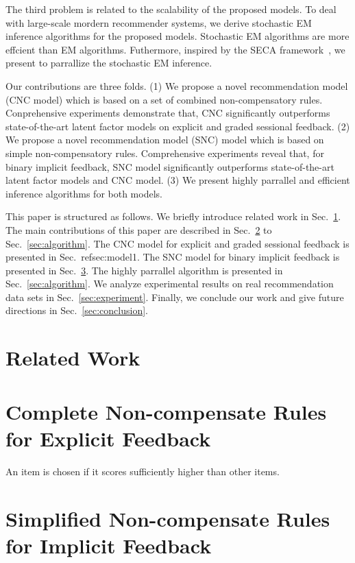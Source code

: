\documentclass[conference]{IEEEtran}
\begin{document}
The third problem is related to the scalability of the proposed models. To deal with large-scale mordern recommender systems, we derive stochastic EM inference algorithms for the proposed models. Stochastic EM algorithms are more effcient than EM algorithms. Futhermore, inspired by the SECA framework~\cite{}, we present to parrallize the stochastic EM inference.   

Our contributions are three folds. (1) We propose a novel recommendation model (CNC model) which is based on a set of combined non-compensatory rules. Conprehensive experiments demonstrate that, CNC significantly outperforms state-of-the-art latent factor models on explicit and graded sessional feedback. (2) We propose a novel recommendation model (SNC) model which is based on simple non-compensatory rules. Comprehensive experiments reveal that,  for binary implicit feedback, SNC model significantly outperforms state-of-the-art latent factor models and CNC model. (3) We present highly parrallel and efficient inference algorithms for both models. 

This paper is structured as follows. We briefly introduce related work in Sec.~\ref{sec:relatedwork}. The main contributions of this paper are described in Sec.~\ref{sec:model1} to Sec.~\ref{sec:algorithm}. The CNC model for explicit and graded sessional feedback is presented in Sec.~ref{sec:model1}. The SNC model for binary implicit feedback is presented in Sec.~\ref{sec:model2}. The highly parrallel algorithm is presented in Sec.~\ref{sec:algorithm}. We analyze experimental results on real recommendation data sets in Sec.~\ref{sec:experiment}. Finally, we conclude our work and give future directions in Sec.~\ref{sec:conclusion}. 


\section{Related Work}\label{sec:relatedwork}



\section{Complete Non-compensate Rules for Explicit Feedback}\label{sec:model1}
 An item is chosen if it scores sufficiently higher than other items. 

\section{Simplified Non-compensate Rules for Implicit Feedback}\label{sec:model2}
\end{document}
